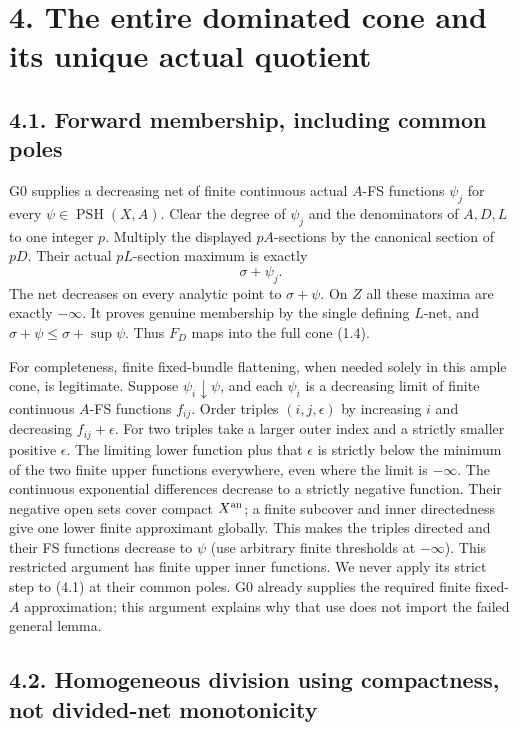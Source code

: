 \documentclass[
  10pt,
]{article}
\begin{document}
\section{4. The entire dominated cone and its unique actual
quotient}\label{the-entire-dominated-cone-and-its-unique-actual-quotient}

\subsection{4.1. Forward membership, including common
poles}\label{forward-membership-including-common-poles}

G0 supplies a decreasing net of finite continuous actual \(A\)-FS
functions \(\psi_j\) for every \(\psi\in\operatorname{PSH}(X,A)\). Clear
the degree of \(\psi_j\) and the denominators of \(A,D,L\) to one
integer \(p\). Multiply the displayed \(pA\)-sections by the canonical
section of \(pD\). Their actual \(pL\)-section maximum is exactly
\[\sigma+\psi_j.\tag{4.1}\] The net decreases on every analytic point to
\(\sigma+\psi\). On \(Z\) all these maxima are exactly \(-\infty\). It
proves genuine membership by the single defining \(L\)-net, and
\(\sigma+\psi\leq\sigma+\sup\psi\). Thus \(F_D\) maps into the full cone
(1.4).

For completeness, finite fixed-bundle flattening, when needed solely in
this ample cone, is legitimate. Suppose \(\psi_i\downarrow\psi\), and
each \(\psi_i\) is a decreasing limit of finite continuous \(A\)-FS
functions \(f_{ij}\). Order triples \((i,j,\epsilon)\) by increasing
\(i\) and decreasing \(f_{ij}+\epsilon\). For two triples take a larger
outer index and a strictly smaller positive \(\epsilon\). The limiting
lower function plus that \(\epsilon\) is strictly below the minimum of
the two finite upper functions everywhere, even where the limit is
\(-\infty\). The continuous exponential differences decrease to a
strictly negative function. Their negative open sets cover compact
\(X^{\rm an}\); a finite subcover and inner directedness give one lower
finite approximant globally. This makes the triples directed and their
FS functions decrease to \(\psi\) (use arbitrary finite thresholds at
\(-\infty\)). This restricted argument has finite upper inner functions.
We never apply its strict step to (4.1) at their common poles. G0
already supplies the required finite fixed-\(A\) approximation; this
argument explains why that use does not import the failed general lemma.

\subsection{4.2. Homogeneous division using compactness, not divided-net
monotonicity}\label{homogeneous-division-using-compactness-not-divided-net-monotonicity}
\end{document}
